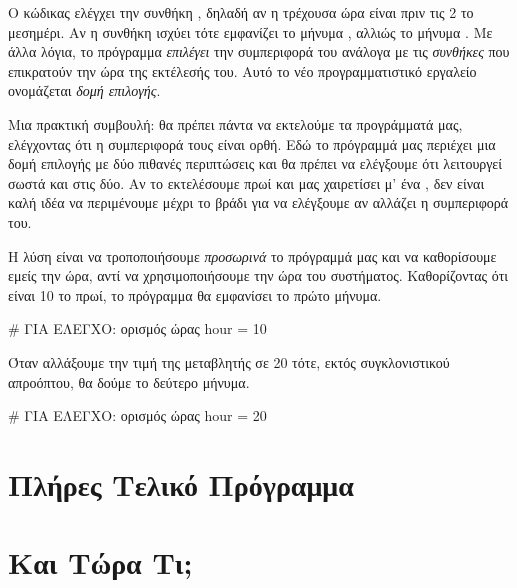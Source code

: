 \documentclass[a4paper,11pt,oneside]{book}
\begin{document}
Ο κώδικας ελέγχει την συνθήκη , δηλαδή αν η τρέχουσα ώρα είναι πριν τις 2 το μεσημέρι. Αν η συνθήκη ισχύει τότε εμφανίζει το μήνυμα , αλλιώς το μήνυμα . Με άλλα λόγια, το πρόγραμμα \emph{επιλέγει} την συμπεριφορά του ανάλογα με τις \emph{συνθήκες} που επικρατούν την ώρα της εκτέλεσής του. Αυτό το νέο προγραμματιστικό εργαλείο ονομάζεται \emph{δομή επιλογής}.

Μια πρακτική συμβουλή: θα πρέπει πάντα να εκτελούμε τα προγράμματά μας, ελέγχοντας ότι η συμπεριφορά τους είναι ορθή. Εδώ το πρόγραμμά μας περιέχει μια δομή επιλογής με δύο πιθανές περιπτώσεις και θα πρέπει να ελέγξουμε ότι λειτουργεί σωστά και στις δύο. Αν το εκτελέσουμε πρωί και μας χαιρετίσει μ' ένα , δεν είναι καλή ιδέα να περιμένουμε μέχρι το βράδι για να ελέγξουμε αν αλλάζει η συμπεριφορά του.

Η λύση είναι να τροποποιήσουμε \emph{προσωρινά} το πρόγραμμά μας και να καθορίσουμε εμείς την ώρα, αντί να χρησιμοποιήσουμε την ώρα του συστήματος.
Καθορίζοντας ότι είναι 10 το πρωί, το πρόγραμμα θα εμφανίσει το πρώτο μήνυμα. 

\begin{pycode}
# ΓΙΑ ΕΛΕΓΧΟ: ορισμός ώρας
hour = 10
\end{pycode}

Όταν αλλάξουμε την τιμή της μεταβλητής  σε 20 τότε, εκτός συγκλονιστικού απροόπτου, θα δούμε το δεύτερο μήνυμα. 

\begin{pycode}
# ΓΙΑ ΕΛΕΓΧΟ: ορισμός ώρας
hour = 20
\end{pycode}




\section{Πλήρες Τελικό Πρόγραμμα}



\section*{Και Τώρα Τι;}
\end{document}
